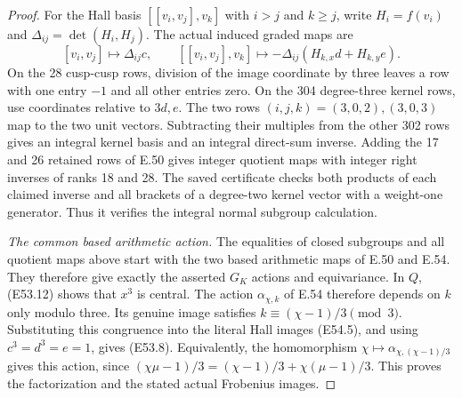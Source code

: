 \begin{proof}
For the Hall basis
$[[v_i,v_j],v_k]$ with $i>j$ and $k\ge j$,
write $H_i=f(v_i)$ and
$\Delta_{ij}=\det(H_i,H_j)$.
The actual induced graded maps are
\[
 [v_i,v_j]\longmapsto\Delta_{ij}c,\qquad
 [[v_i,v_j],v_k]\longmapsto
       -\Delta_{ij}(H_{k,x}d+H_{k,y}e).
 \tag{E53.15}
\]
On the 28 cusp-cusp rows, division of the
image coordinate by three leaves a row
with one entry $-1$ and all other entries
zero. On the 304 degree-three kernel rows,
use coordinates relative to $3d,e$.
The two rows $(i,j,k)=(3,0,2),(3,0,3)$
map to the two unit vectors.
Subtracting their multiples from the
other 302 rows gives an integral kernel
basis and an integral direct-sum inverse.
Adding the 17 and 26 retained rows of
E.50 gives integer quotient maps with
integer right inverses of ranks 18 and 28.
The saved certificate checks both products
of each claimed inverse and all brackets
of a degree-two kernel vector with a
weight-one generator. Thus it verifies the
integral normal subgroup calculation.

\emph{The common based arithmetic action.}
The equalities of closed subgroups and all
quotient maps above start with the two
based arithmetic maps of E.50 and E.54.
They therefore give exactly the asserted
$G_K$ actions and equivariance.
In $Q$, (E53.12) shows that $x^3$ is central.
The action $\alpha_{\chi,k}$ of E.54
therefore depends on $k$ only modulo three.
Its genuine image satisfies
$k\equiv(\chi-1)/3\pmod3$.
Substituting this congruence into the
literal Hall images (E54.5), and using
$c^3=d^3=e=1$, gives (E53.8).
Equivalently, the homomorphism
$\chi\mapsto\alpha_{\chi,(\chi-1)/3}$
gives this action, since
$(\chi\mu-1)/3=(\chi-1)/3+
\chi(\mu-1)/3$.
This proves the factorization and the
stated actual Frobenius images.
\end{proof}
